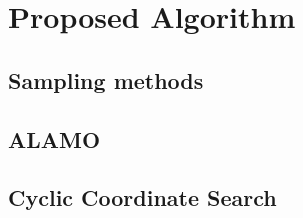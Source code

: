 \chapter{Proposed Algorithm}

\begin{algorithm}
   
\end{algorithm}

\section{Sampling methods}

\section{ALAMO}

\section{Cyclic Coordinate Search}
